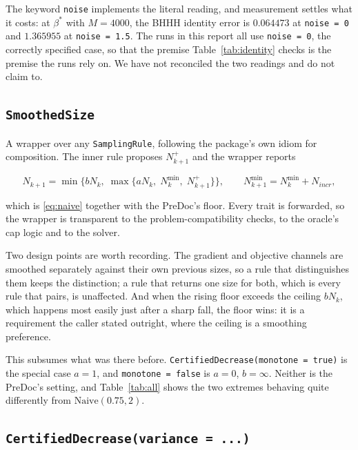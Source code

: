 \documentclass[11pt,a4paper]{article}
\begin{document}
The keyword \texttt{noise} implements the literal reading, and measurement settles
what it costs: at $\beta^*$ with $M = 4000$, the BHHH identity error is $0.064473$
at \texttt{noise = 0} and $1.365955$ at \texttt{noise = 1.5}. The runs in this
report all use \texttt{noise = 0}, the correctly specified case, so that the premise
Table~\ref{tab:identity} checks is the premise the runs rely on. We have not
reconciled the two readings and do not claim to.

\subsection{\texorpdfstring{\texttt{SmoothedSize}}{SmoothedSize}}

A wrapper over any \texttt{SamplingRule}, following the package's own idiom for
composition. The inner rule proposes $N^{+}_{k+1}$ and the wrapper reports

\begin{equation}
  N_{k+1} = \min\bigl\{ b N_k,\; \max\{ a N_k,\; N^{\min}_k,\; N^{+}_{k+1}\} \bigr\},
  \qquad N^{\min}_{k+1} = N^{\min}_k + N_{incr},
\end{equation}

which is \eqref{eq:naive} together with the PreDoc's floor. Every trait is
forwarded, so the wrapper is transparent to the problem-compatibility checks, to
the oracle's cap logic and to the solver.

Two design points are worth recording. The gradient and objective channels are
smoothed separately against their own previous sizes, so a rule that distinguishes
them keeps the distinction; a rule that returns one size for both, which is every
rule that pairs, is unaffected. And when the rising floor exceeds the ceiling
$bN_k$, which happens most easily just after a sharp fall, the floor wins: it is a
requirement the caller stated outright, where the ceiling is a smoothing
preference.

This subsumes what was there before. \texttt{CertifiedDecrease(monotone = true)} is
the special case $a = 1$, and \texttt{monotone = false} is $a = 0$, $b = \infty$.
Neither is the PreDoc's setting, and Table~\ref{tab:all} shows the two extremes
behaving quite differently from $\mathrm{Naive}(0.75, 2)$.

\subsection{\texorpdfstring{\texttt{CertifiedDecrease(variance = ...)}}{CertifiedDecrease(variance)}}
\label{sec:variance-feature}
\end{document}
